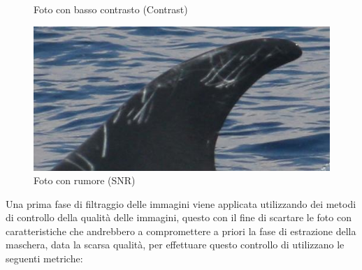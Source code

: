 \documentclass[a4paper,12pt]{report}
\begin{document}
\begin{figure}[H]
\begin{minipage}{0.3\textwidth}
        \caption{Foto con basso contrasto (Contrast)}
      \end{minipage}
      \begin{minipage}{0.3\textwidth}
        \centering
        \includegraphics[width=\textwidth]{assets/images/methods/porting/quality_control/snr.png}   
        \caption{Foto con rumore (SNR)}
      \end{minipage}
    \end{figure}
    Una prima fase di filtraggio delle immagini viene applicata utilizzando dei metodi di 
    controllo della qualità delle immagini, questo con il fine di scartare le foto con caratteristiche 
    che andrebbero a compromettere a priori la fase di estrazione della maschera, data la scarsa qualità,
    per effettuare questo controllo di utilizzano le seguenti metriche:
\end{document}
